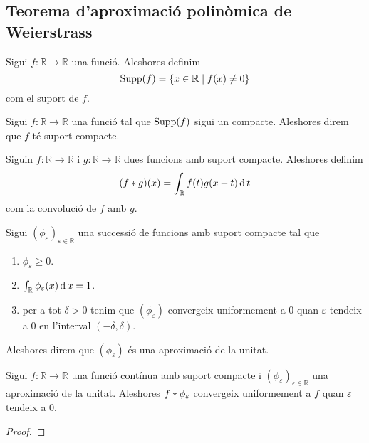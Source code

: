 \documentclass[../../Main.tex]{subfiles}
\begin{document}
	\subsection{Teorema d'aproximació polinòmica de Weierstrass}
	\begin{definition}
		\label{def:suport d'una funció}
		Sigui \(f\colon\mathbb{R}\longrightarrow\mathbb{R}\) una funció. Aleshores definim
		\[\operatorname*{Supp}(f)=\{x\in\mathbb{R}\mid f(x)\neq0\}\]
		com el suport de \(f\).
	\end{definition}
	\begin{definition}
		\label{def:funció amb suport compacte}
		Sigui \(f\colon\mathbb{R}\longrightarrow\mathbb{R}\) una funció tal que \(\operatorname*{Supp}(f)\) sigui un compacte. Aleshores direm que \(f\) té suport compacte.
	\end{definition}
	\begin{definition}[Convolució]
		\label{def:convolució de dues funcions}
		Siguin \(f\colon\mathbb{R}\longrightarrow\mathbb{R}\) i \(g\colon\mathbb{R}\longrightarrow\mathbb{R}\) dues funcions amb suport compacte. Aleshores definim
		\[(f\mathbin{\ast} g)(x)=\int_{\mathbb{R}}f(t)g(x-t)\operatorname{d} t\]
		com la convolució de \(f\) amb \(g\).
	\end{definition}
	\begin{definition}
		\label{def:aproximació de la unitat}
		Sigui \((\phi_{\varepsilon})_{\varepsilon\in\mathbb{R}}\) una successió de funcions amb suport compacte tal que
		\begin{enumerate}
			\item \(\phi_{\varepsilon}\geq0\).
			\item \(\int_{\mathbb{R}}\phi_{\varepsilon}(x)\operatorname{d} x=1\).
			\item per a tot \(\delta>0\) tenim que \((\phi_{\varepsilon})\) convergeix uniformement a \(0\) quan \(\varepsilon\) tendeix a \(0\) en l'interval \((-\delta,\delta)\).
		\end{enumerate}
		Aleshores direm que \((\phi_{\varepsilon})\) és una aproximació de la unitat.
	\end{definition}
	\begin{lemma}
		\label{lema:Teorema d'aproximació polinòmica de Weierstrass}
		Sigui \(f\colon\mathbb{R}\longrightarrow\mathbb{R}\) una funció contínua amb suport compacte i \((\phi_{\varepsilon})_{\varepsilon\in\mathbb{R}}\) una aproximació de la unitat. Aleshores \(f\mathbin{\ast}\phi_{\varepsilon}\) convergeix uniformement a \(f\) quan \(\varepsilon\) tendeix a \(0\).
		\begin{proof}
		\end{proof}
	\end{lemma}
\end{document}
